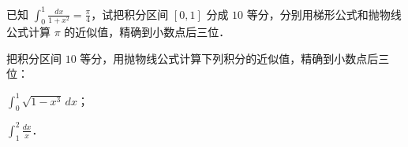 \begin{xiti}
\item 已知 $\int_0^1 \frac{dx}{1 + x^2} = \frac{\pi}{4}$，试把积分区间 $[0,1]$ 分成 $10$ 等分，分别用梯形公式和抛物线公式计算 $\pi$ 的近似值，精确到小数点后三位．

\item 把积分区间 $10$ 等分，用抛物线公式计算下列积分的近似值，精确到小数点后三位：
\begin{ziti}
\item $\displaystyle \int_0^1 \sqrt{1 - x^3}\,dx$；
\item $\displaystyle \int_1^2 \frac{dx}{x}$．
\end{ziti}
\end{xiti}

